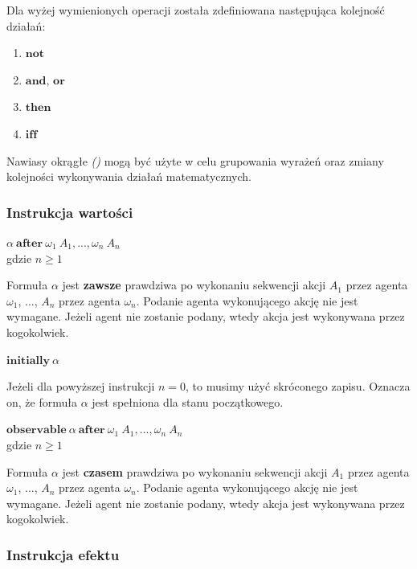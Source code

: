 \documentclass[11pt,a4paper]{article}
\begin{document}
    Dla wyżej wymienionych operacji została zdefiniowana następująca kolejność działań:
    \begin{enumerate}
        \item $\mathbf{not}$
        \item $\mathbf{and}$, $\mathbf{or}$
        \item $\mathbf{then}$
        \item $\mathbf{iff}$
    \end{enumerate}
   
    Nawiasy okrągłe \textit{()} mogą być użyte w celu grupowania wyrażeń oraz zmiany kolejności wykonywania działań matematycznych.
    
    \subsubsection{Instrukcja wartości}
    
    \begin{center}
        $\alpha~\mathbf{after}~\omega_1~A_1,...,\omega_n~A_n$
        \\gdzie $n \geq 1$
    \end{center}
    Formuła $\alpha$ jest \textbf{zawsze} prawdziwa po wykonaniu sekwencji akcji $A_1$ przez agenta $\omega_1$, $...$, $A_n$ przez agenta $\omega_n$. Podanie agenta wykonującego akcję nie jest wymagane. Jeżeli agent nie zostanie podany, wtedy akcja jest wykonywana przez kogokolwiek.
    
    \begin{center}
            $\mathbf{initially}~\alpha$
    \end{center}    
        Jeżeli dla powyższej instrukcji $n=0$, to musimy użyć skróconego zapisu. Oznacza on, że formuła $\alpha$ jest spełniona dla stanu początkowego.
                
    \begin{center}    
        $\mathbf{observable}~\alpha~\mathbf{after}~\omega_1~A_1,...,\omega_n~A_n$
        \\gdzie $n \geq 1$
    \end{center}
    Formuła $\alpha$ jest \textbf{czasem} prawdziwa po wykonaniu sekwencji akcji $A_1$ przez agenta $\omega_1$, $...$, $A_n$ przez agenta $\omega_n$. Podanie agenta wykonującego akcję nie jest wymagane. Jeżeli agent nie zostanie podany, wtedy akcja jest wykonywana przez kogokolwiek.
    
    \subsubsection{Instrukcja efektu}
    
\end{document}
